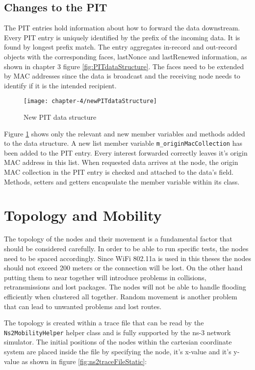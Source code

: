 \subsection{Changes to the PIT}

The PIT entries hold information about how to forward the data downstream. Every PIT entry is uniquely identified by the prefix of the incoming data. It is found by longest prefix match. The entry aggregates in-record and out-record objects with the corresponding faces, lastNonce and lastRenewed information, as shown in chapter 3 figure \ref{fig:PITdataStructure}. The faces need to be extended by MAC addresses since the data is broadcast and the receiving node needs to identify if it is the intended recipient.

\begin{figure}[H]
  \centering
  \texttt{[image: chapter-4/newPITdataStructure]}
  \caption{New PIT data structure}
  \label{fig:newPITdataStructure}
\end{figure}

Figure \ref{fig:newPITdataStructure} shows only the relevant and new member variables and methods added to the data structure. A new list member variable \texttt{m\_originMacCollection} has been added to the PIT entry. Every interest forwarded correctly leaves it's origin MAC address in this list. When requested data arrives at the node, the origin MAC collection in the PIT entry is checked and attached to the data's field. Methods, setters and getters encapsulate the member variable within its class.

\newpage

\section{Topology and Mobility}

The topology of the nodes and their movement is a fundamental factor that should be considered carefully. In order to be able to run specific tests, the nodes need to be spaced accordingly. Since WiFi 802.11a is used in this theses the nodes should not exceed 200 meters or the connection will be lost. On the other hand putting them to near together will introduce problems in collisions, retransmissions and lost packages. The nodes will not be able to handle flooding efficiently when clustered all together. Random movement is another problem that can lead to unwanted problems and lost routes.
 
The topology is created within a trace file that can be read by the \texttt{Ns2MobilityHelper} helper class and is fully supported by the ns-3 network simulator. The initial positions of the nodes within the cartesian coordinate system are placed inside the file by specifying the node, it's x-value and it's y-value as shown in figure \ref{fig:ns2traceFileStatic}:

